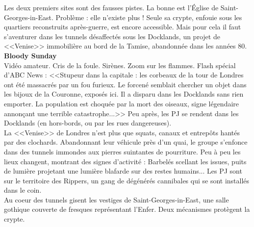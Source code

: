 \documentclass[11pt,twoside,a4paper]{book}
\begin{document}

Les deux premiers sites sont des fausses pistes. La bonne est l'{\'E}glise de Saint-Georges-in-East. Probl{\`e}me : elle n'existe plus ! Seule sa crypte, enfouie sous les quartiers reconstruits apr{\`e}s-guerre, est encore accessible. Mais pour cela il faut s'aventurer dans les tunnels d{\'e}saffect{\'e}s sous les Docklands, un projet de <<Venise>> immobili{\`e}re au bord de la Tamise, abandonn{\'e}e dans les ann{\'e}es 80.~\\

\textbf{\large Bloody Sunday}~\\

Vid{\'e}o amateur. Cris de la foule. Sir{\`e}nes. Zoom sur les flammes. Flash sp{\'e}cial d'ABC News : <<Stupeur dans la capitale : les corbeaux de la tour de Londres ont {\'e}t{\'e} massacr{\'e}s par un fou furieux. Le forcen{\'e} semblait chercher un objet dans les bijoux de la Couronne, expos{\'e}s ici. Il a disparu dans les Docklands sans rien emporter. La population est choqu{\'e}e par la mort des oiseaux, signe l{\'e}gendaire annon\c{c}ant une terrible catastrophe...>> Peu apr{\`e}s, les PJ se rendent dans les Docklands (en hors-bords, ou par les rues dangereuses).~\\
La <<Venise>> de Londres n'est plus que squats, canaux et entrep{\^o}ts hant{\'e}s par des clochards. Abandonnant leur v{\'e}hicule pr{\`e}s d'un quai, le groupe s'enfonce dans des tunnels immondes aux pierres suintantes de pourriture. Peu {\`a} peu les lieux changent, montrant des signes d'activit{\'e} : Barbel{\'e}s scellant les issues, puits de lumi{\`e}re projetant une lumi{\`e}re blafarde sur des restes humains... Les PJ sont sur le territoire des Rippers, un gang de d{\'e}g{\'e}n{\'e}r{\'e}s cannibales qui se sont install{\'e}s dans le coin.~\\
Au coeur des tunnels gisent les vestiges de Saint-Georges-in-East, une salle gothique couverte de fresques repr{\'e}sentant l'Enfer. Deux m{\'e}canismes prot{\`e}gent la crypte.~\\
\end{document}
